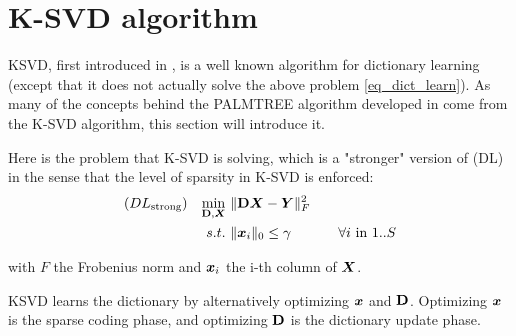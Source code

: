 \section{K-SVD algorithm}

\ac{KSVD}, first introduced in \cite{aharon_k-svd:_2006}, is a well known algorithm for dictionary learning (except that it does not actually solve the above problem \cref{eq_dict_learn}). As many of the concepts behind the PALMTREE algorithm developed in \cite{chabiron_optimization_2016} come from the K-SVD algorithm, this section will introduce it. %

Here is the problem that K-SVD is solving, which is a "stronger" version of (DL) in the sense that the level of sparsity in K-SVD is enforced:
\begin{equation*}  \begin{aligned}
(DL_{\text{strong}}) && \underset{\mathbf D,\bm X}{\min}~ & \lVert \mathbf D\bm X-\bm{Y} \rVert^2_F \\
&& s.t.~& \lVert \bm x_i \rVert_0 \le \gamma & \quad \forall i \text{ in } 1..S
\end{aligned} \label{eq_ksvd} \end{equation*}

with $F$ the Frobenius norm and $\bm x_i$ the i-th column of $\bm X$.

\ac{KSVD} learns the dictionary by alternatively optimizing $\bm x$ and $\mathbf D$. Optimizing $\bm x$ is the sparse coding phase, and optimizing $\mathbf D$ is the dictionary update phase.

